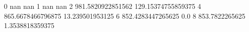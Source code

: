 0 nan nan
1 nan nan
2 981.5820922851562 129.15374755859375
4 865.6678466796875 13.239501953125
6 852.4283447265625 0.0
8 853.7822265625 1.3538818359375
